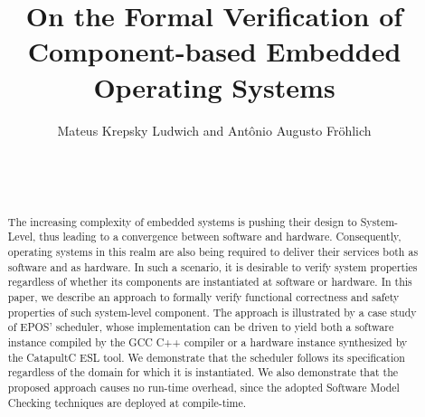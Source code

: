 \documentclass{sig-alternate}
\begin{document}
%
\crfee{}


\title{On the Formal Verification of Component-based Embedded Operating Systems}

\author{
\alignauthor
Mateus Krepsky Ludwich and Antônio Augusto Fröhlich\\
       \\
       \\
       \\
}

\date{}

\maketitle

\begin{abstract}
  The increasing complexity of embedded systems is pushing their design
  to System-Level, thus leading to a convergence between software and
  hardware. Consequently, operating systems in this realm are also being
  required to deliver their services both as software and as hardware.
  In such a scenario, it is desirable to verify system properties
  regardless of whether its components are instantiated at software or
  hardware. In this paper, we describe an approach to formally verify
  functional correctness and safety properties of such system-level
  component. The approach is illustrated by a case study of EPOS'
  scheduler, whose implementation can be driven to yield both a software
  instance compiled by the GCC C++ compiler or a hardware instance
  synthesized by the CatapultC ESL tool. We demonstrate that the
  scheduler follows its specification regardless of the domain for which
  it is instantiated. We also demonstrate that the proposed approach
  causes no run-time overhead, since the adopted Software Model Checking
  techniques are deployed at compile-time.
\end{abstract}
\end{document}
